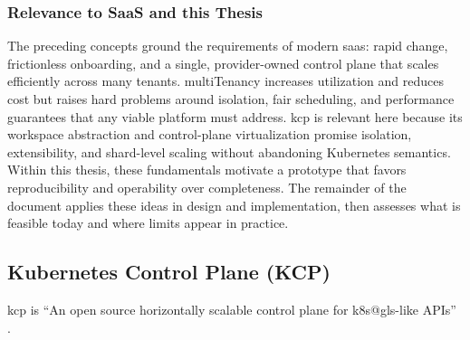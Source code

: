 \documentclass[11pt, a4paper, oneside, listof=totoc]{scrartcl}
\begin{document}
            \subsubsection{Relevance to SaaS and this Thesis}
                The preceding concepts ground the requirements of modern \gls{saas}: rapid change,
                frictionless onboarding, and a single, provider-owned control plane that scales
                efficiently across many tenants.
                \Gls{multiTenancy} increases utilization and reduces cost but raises hard problems around
                isolation, fair scheduling, and performance guarantees that any viable platform must
                address.
                \gls{kcp} is relevant here because its workspace abstraction and control-plane
                virtualization promise isolation, extensibility, and shard-level scaling without
                abandoning Kubernetes semantics.
                Within this thesis, these fundamentals motivate a prototype that favors
                reproducibility and operability over completeness.
                The remainder of the document applies these ideas in design and implementation, then
                assesses what is feasible today and where limits appear in practice.

        \newpage

        \subsection{Kubernetes Control Plane (KCP)}\label{subsec:kcp}
            \gls{kcp} is \enquote{An open source horizontally scalable control plane for
            \gls{k8s@gls}-like APIs} \parencite{kcpio}.
\end{document}

